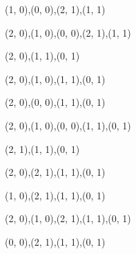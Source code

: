 \begin{figure}
\begin{subfigure}[b]{0.14\textwidth}
    \resizebox{\linewidth}{!} {
       {{(1, 0),(0, 0),(2, 1),(1, 1)}} {{}}
    }
  \end{subfigure}
  \begin{subfigure}[b]{0.14\textwidth}
    \resizebox{\linewidth}{!} {
       {{(2, 0),(1, 0),(0, 0),(2, 1),(1, 1)}} {{}}
    }
  \end{subfigure}
  \begin{subfigure}[b]{0.14\textwidth}
    \resizebox{\linewidth}{!} {
       {{(2, 0),(1, 1),(0, 1)}} {{}}
    }
  \end{subfigure}
  \begin{subfigure}[b]{0.14\textwidth}
    \resizebox{\linewidth}{!} {
       {{(2, 0),(1, 0),(1, 1),(0, 1)}} {{}}
    }
  \end{subfigure}
  \begin{subfigure}[b]{0.14\textwidth}
    \resizebox{\linewidth}{!} {
       {{(2, 0),(0, 0),(1, 1),(0, 1)}} {{}}
    }
  \end{subfigure}
  \begin{subfigure}[b]{0.14\textwidth}
    \resizebox{\linewidth}{!} {
       {{(2, 0),(1, 0),(0, 0),(1, 1),(0, 1)}} {{}}
    }
  \end{subfigure}
  \begin{subfigure}[b]{0.14\textwidth}
    \resizebox{\linewidth}{!} {
       {{(2, 1),(1, 1),(0, 1)}} {{}}
    }
  \end{subfigure}
  \begin{subfigure}[b]{0.14\textwidth}
    \resizebox{\linewidth}{!} {
       {{(2, 0),(2, 1),(1, 1),(0, 1)}} {{}}
    }
  \end{subfigure}
  \begin{subfigure}[b]{0.14\textwidth}
    \resizebox{\linewidth}{!} {
       {{(1, 0),(2, 1),(1, 1),(0, 1)}} {{}}
    }
  \end{subfigure}
  \begin{subfigure}[b]{0.14\textwidth}
    \resizebox{\linewidth}{!} {
       {{(2, 0),(1, 0),(2, 1),(1, 1),(0, 1)}} {{}}
    }
  \end{subfigure}
  \begin{subfigure}[b]{0.14\textwidth}
    \resizebox{\linewidth}{!} {
       {{(0, 0),(2, 1),(1, 1),(0, 1)}} {{}}
    }
  \end{subfigure}
  \begin{subfigure}[b]{0.14\textwidth}
    \resizebox{\linewidth}{!} {
}
\end{subfigure}
\end{figure}
